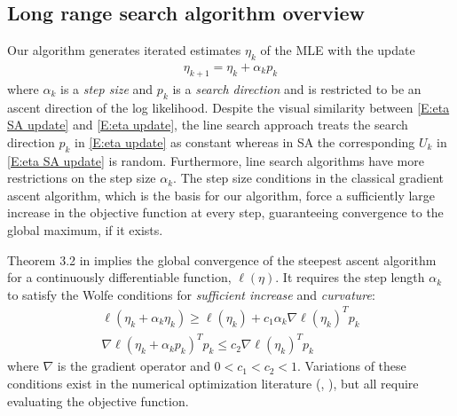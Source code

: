 

\subsection{Long range search algorithm overview}  \label{S:algorithm overview}

Our algorithm generates iterated estimates $\eta_k$ of the MLE with the 
update 
\begin{align} \label{E:eta update}
	\eta_{k+1} = \eta_k + \alpha_k p_k
\end{align}
where $\alpha_k$ is a \emph{step size} and $p_k$ is a \emph{search direction} and is 
restricted to be an ascent direction of 
the log likelihood.  
Despite the visual similarity between \eqref{E:eta SA update} and \eqref{E:eta 
update}, the line search approach treats 
the search direction $p_k$ in \eqref{E:eta update} as constant whereas in SA the 
corresponding $U_k$ in \eqref{E:eta SA update} is random.
Furthermore, line search algorithms have more restrictions on the step size $\alpha_k$.  
The step size 
conditions in the classical gradient ascent algorithm, which is the basis for our 
algorithm, force  a sufficiently 
large increase in the objective function at every step, guaranteeing convergence to 
the global maximum, if it exists.

Theorem 3.2 in \citet{NW} implies the global convergence of the steepest ascent 
algorithm for a continuously differentiable function, $\ell(\eta)$.  It requires the 
step length $\alpha_k$ to satisfy 
the Wolfe conditions for \emph{sufficient increase} and \emph{curvature}:
\begin{equation} \label{eq:wolfe}
\begin{split}
	\ell(\eta_k + \alpha_k \eta_k) \geq \ell(\eta_k) + c_1 \alpha_k \nabla \ell (\eta_k)^T p_k \\
	\nabla \ell( \eta_k + \alpha_k p_k)^T p_k \leq c_2 \nabla \ell( \eta_k)^T p_k
\end{split}
\end{equation}
where $\nabla$ is the gradient operator and $0 < c_1 < c_2 < 1$.   
Variations of these conditions exist in the numerical optimization literature 
(\citet[Chapter 3]{NW}, \citet[Chapter 2]{Sun:2006}), but all 
require evaluating the objective function.

